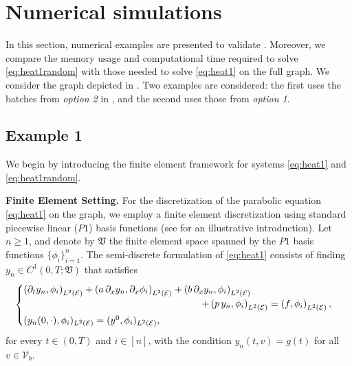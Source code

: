 \documentclass[a4paper, 10pt, english]{article}
\begin{document}
\section{Numerical simulations}\label{sec:numerical_simulations}
In this section, numerical examples are presented to validate . Moreover, we compare the memory usage and computational time required to solve \eqref{eq:heat1random} with those needed to solve \eqref{eq:heat1} on the full graph. We consider the graph depicted in . Two examples are considered: the first uses the batches from \textit{option 2} in , and the second uses those from \textit{option 1}.

\subsection{Example 1}\label{section:example1}
 We begin by introducing the finite element framework for systems \eqref{eq:heat1} and \eqref{eq:heat1random}.

\noindent
\textbf{Finite Element Setting.} For the discretization of the parabolic equation \eqref{eq:heat1} on the graph, we employ a finite element discretization using standard piecewise linear ($P1$) basis functions (see \cite{firstpaper} for an illustrative introduction). Let $n\geq 1$, and denote by $\mathfrak{V}$ the finite element space spanned by the $P1$ basis functions $\{\phi_i\}_{i=1}^n$. The semi-discrete formulation of \eqref{eq:heat1} consists of finding $y_n\in C^1(0,T;\mathfrak{V})$ that satisfies
\begin{align}\label{eq:semi_discrete_parabolic}
    \begin{cases}
        \left(\partial_t y_n,\phi_i\right)_{L^2(\mathcal{E})} + \left(a\,\partial_x y_n, \partial_x \phi_i\right)_{L^2(\mathcal{E})} + \left(b\,\partial_x y_n, \phi_i\right)_{L^2(\mathcal{E})}\\\hspace{6.5cm}+ \left(p\,y_n, \phi_i\right)_{L^2(\mathcal{E})} = \left(f, \phi_i\right)_{L^2(\mathcal{E})},\\[1mm]
        (y_n(0,\cdot), \phi_i)_{L^2(\mathcal{E})} = (y^0, \phi_i)_{L^2(\mathcal{E})},
    \end{cases}
\end{align}
for every $t\in (0,T)$ and $i\in[n]$, with the condition $y_n(t,v)=g(t)$ for all $v\in \mathcal{V}_b$.
\end{document}
